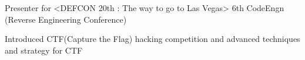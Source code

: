 \begin{cventries}
  \cventry
    {Presenter for <DEFCON 20th : The way to go to Las Vegas>}
    {6th CodeEngn (Reverse Engineering Conference)}
    {}
    {}
    {
      \begin{cvitems}
        \item {Introduced CTF(Capture the Flag) hacking competition and advanced techniques and strategy for CTF}
      \end{cvitems}
    }
\end{cventries}
